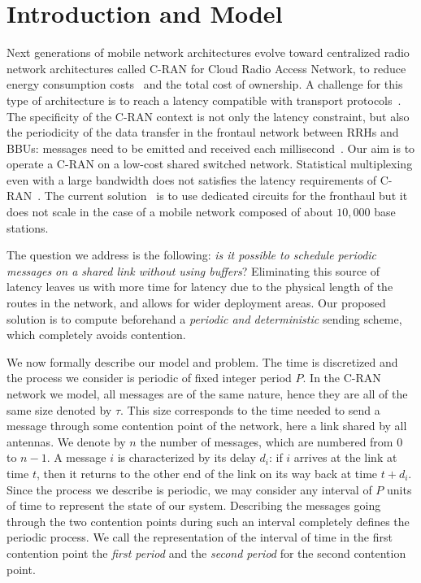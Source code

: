 \documentclass[10pt, conference, letterpaper]{algotel}
\begin{document}
\section{Introduction and Model}

Next generations of mobile network architectures evolve toward centralized radio network architectures called C-RAN for Cloud Radio Access Network, to reduce energy consumption costs~\cite{mobile2011c} and the total cost of ownership. A challenge for this type of architecture is to reach a latency compatible with transport protocols~\cite{ieeep802}. The specificity of the C-RAN context is not only the latency constraint, but also the periodicity of the data transfer in the frontaul network between RRHs and BBUs: messages need to be emitted and received each millisecond~\cite{bouguen2012lte}. Our aim is to operate a C-RAN on a low-cost shared switched network. Statistical multiplexing even with a large bandwidth does not satisfies the latency requirements of C-RAN~\cite{barth2018deterministic}. The current solution~\cite{tayq2017real} is to use dedicated circuits for the fronthaul but it does not scale in the case of a mobile network composed of about $10,000$ base stations. 

The question we address is the following: \emph{is it possible to schedule periodic messages on a shared link without using buffers}? Eliminating this source of latency leaves us with more time for latency due to the physical length of the routes in the network, and allows for wider deployment areas. Our proposed solution is to compute beforehand a \emph{periodic and deterministic} sending scheme, which completely avoids contention. 

We now formally describe our model and problem.
The time is discretized and the process we consider is periodic of fixed integer period $P$. In the C-RAN network we model, all messages are of the same nature, hence they are all of the same size denoted by $\tau$. This size corresponds to the time needed to send a message through some contention point of the network, here a link shared by all antennas. We denote by $n$ the number of messages, which are numbered from $0$ to $n-1$. A message $i$ is characterized by its delay $d_i$: if $i$ arrives at the link at time $t$, then it returns to the other end of the link on its way back at time $t + d_i$. Since the process we describe is periodic, we may consider any interval of $P$ units of time
to represent the state of our system. Describing the messages going through the two contention points during such an interval completely defines the periodic process. We call the representation of the interval of time in the first contention point the \emph{first period} and the \emph{second period} for the second contention point.
\end{document}
